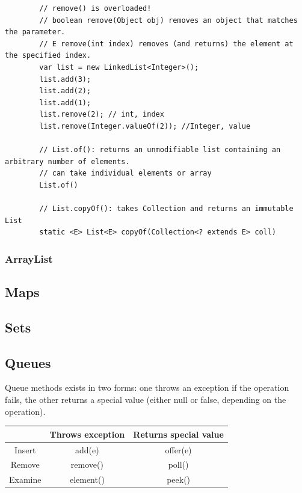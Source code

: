 \documentclass{scrartcl}
\begin{document}
    \begin{lstlisting}
        // remove() is overloaded!
        // boolean remove(Object obj) removes an object that matches the parameter.
        // E remove(int index) removes (and returns) the element at the specified index.
        var list = new LinkedList<Integer>();
        list.add(3);
        list.add(2);
        list.add(1);
        list.remove(2); // int, index
        list.remove(Integer.valueOf(2)); //Integer, value

        // List.of(): returns an unmodifiable list containing an arbitrary number of elements.
        // can take individual elements or array
        List.of()

        // List.copyOf(): takes Collection and returns an immutable List
        static <E> List<E> copyOf(Collection<? extends E> coll)
        \end{lstlisting}


\subsubsection{ArrayList}




\subsection{Maps}

\subsection{Sets}

\subsection{Queues}

    Queue methods exists in two forms: one throws an exception if the operation fails, the other returns a special value (either null or false, depending on the operation).

    \bigskip

    \begin{tabular}{|c|c|c|}
        \hline
        & Throws exception & Returns special value \\
        \hline
        Insert & add(e) & offer(e) \\
        \hline
        Remove & remove() & poll() \\
        \hline
        Examine & element() & peek() \\
        \hline
    \end{tabular}
\end{document}
